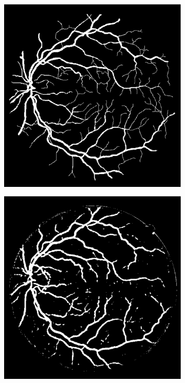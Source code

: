 \documentclass[aps,prb,10pt,twocolumn,groupedaddress]{revtex4-1}
\begin{document}
\begin{figure}[!t]
\begin{subfigure}[]{0.22\textwidth}
		\caption{}
	\end{subfigure}
	\hspace{0.25cm}
	\centering
	\begin{subfigure}[]{0.22\textwidth}
		\centering
		\includegraphics[width=\textwidth]{images/09_manual1.eps}
		\caption{}
	\end{subfigure}
	\hspace{0.25cm}
	\centering
	\begin{subfigure}[]{0.22\textwidth}
		\centering
		\includegraphics[width=\textwidth]{images/09_test_nn_best_accuracy_93.eps}

\end{subfigure}
\end{figure}
\end{document}

